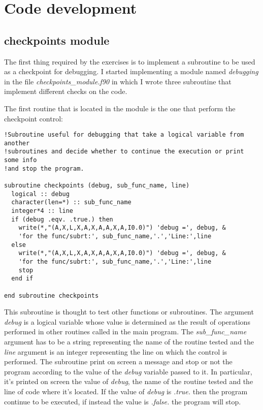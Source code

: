 \documentclass[prb,9pt,notitlepage]{revtex4-1}
\begin{document}
\section{Code development}
\subsection{checkpoints module}
The first thing required by the exercises is to implement a subroutine to be used as a checkpoint for debugging. I started implementing a module named \textit{debugging} in the file \textit{checkpoints\_module.f90} in which I wrote three subroutine that implement different checks on the code.

The first routine that is located in the module is the one that perform the checkpoint control:
\begin{lstlisting}
!Subroutine useful for debugging that take a logical variable from another
!subroutines and decide whether to continue the execution or print some info
!and stop the program.

subroutine checkpoints (debug, sub_func_name, line)
  logical :: debug
  character(len=*) :: sub_func_name
  integer*4 :: line
  if (debug .eqv. .true.) then
    write(*,"(A,X,L,X,A,X,A,A,X,A,I0.0)") 'debug =', debug, &
    'for the func/subrt:', sub_func_name,'.','Line:',line
  else
    write(*,"(A,X,L,X,A,X,A,A,X,A,I0.0)") 'debug =', debug, &
    'for the func/subrt:', sub_func_name,'.','Line:',line
    stop
  end if

end subroutine checkpoints
\end{lstlisting}
This subroutine is thought to test other functions or subroutines. The argument \textit{debug} is a logical variable whose value is determined as the result of operations performed in other routines called in the main program.
The \textit{sub\_func\_name} argument has to be a string representing the name of the routine tested and the \textit{line} argument is an integer representing the line on which the control is performed. The subroutine print on screen a message and stop or not the program according to the value of the \textit{debug} variable passed to it. In particular, it's printed on screen the value of \textit{debug}, the name of the routine tested and the line of code where it's located. If the value of \textit{debug} is \textit{.true.} then the program continue to be executed, if instead the value is \textit{.false.} the program will stop.
\end{document}

